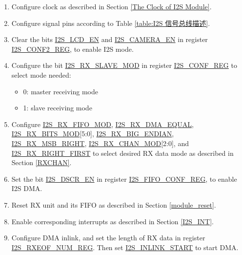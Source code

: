 \documentclass[main\_\_EN.tex]{subfiles}
\begin{document}
\begin{enumerate}
    \item Configure clock as described in Section \ref{The Clock of I2S Module}.

    \item Configure signal pins according to Table \ref{table:I2S 信号总线描述}.

    \item Clear the bits \hyperref[fielddesc:I2SLCDEN]{I2S\_LCD\_EN} and \hyperref[fielddesc:I2SCAMERAEN]{I2S\_CAMERA\_EN} in register \hyperref[regdesc:I2SCONF2REG]{I2S\_CONF2\_REG}, to enable I2S mode.


    \item Configure the bit \hyperref[fielddesc:I2SRXSLAVEMOD]{I2S\_RX\_SLAVE\_MOD} in register \hyperref[regdesc:I2SCONFREG]{I2S\_CONF\_REG} to select mode needed:
    \begin{itemize}
        \item 0: master receiving mode
        \item 1: slave receiving mode
    \end{itemize}

    \item Configure \hyperref[fielddesc:I2SRXFIFOMOD]{I2S\_RX\_FIFO\_MOD}, \hyperref[fielddesc:I2SRXDMAEQUAL]{I2S\_RX\_DMA\_EQUAL}, \hyperref[fielddesc:I2SRXBITSMOD]{I2S\_RX\_BITS\_MOD}[5:0], \hyperref[fielddesc:I2SRXBIGENDIAN]{I2S\_RX\_BIG\_ENDIAN}, \hyperref[fielddesc:I2SRXMSBRIGHT]{I2S\_RX\_MSB\_RIGHT}, \hyperref[fielddesc:I2SRXCHANMOD]{I2S\_RX\_CHAN\_MOD}[2:0], and \hyperref[fielddesc:I2SRXRIGHTFIRST]{I2S\_RX\_RIGHT\_FIRST} to select desired RX data mode as described in Section \ref{RXCHAN}.

    \item Set the bit \hyperref[fielddesc:I2SDSCREN]{I2S\_DSCR\_EN} in register \hyperref[regdesc:I2SFIFOCONFREG]{I2S\_FIFO\_CONF\_REG}, to enable I2S DMA.

    \item Reset RX unit and its FIFO as described in Section \ref{module_reset}.
    \item Enable corresponding interrupts as described in Section \ref{I2S_INT}. \label{i2s-rx-step8}

    \item Configure DMA inlink, and set the length of RX data in register \hyperref[regdesc:I2SRXEOFNUMREG]{I2S\_RXEOF\_NUM\_REG}. Then set \hyperref[fielddesc:I2SINLINKSTART]{I2S\_INLINK\_START} to start DMA.


\end{enumerate}
\end{document}
